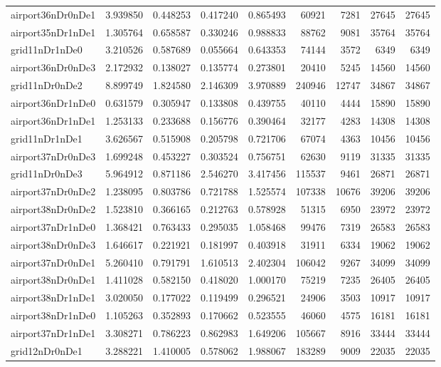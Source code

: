 \documentclass[../../../thesis.tex]{subfiles}
\begin{document}
\begin{longtable}{|l|r|r|r|r|r|r|r|r|}
airport36nDr0nDe1 & 3.939850 & 0.448253 & 0.417240 & 0.865493 & 60921 & 7281 & 27645 & 27645 \\
airport35nDr1nDe1 & 1.305764 & 0.658587 & 0.330246 & 0.988833 & 88762 & 9081 & 35764 & 35764 \\
grid11nDr1nDe0 & 3.210526 & 0.587689 & 0.055664 & 0.643353 & 74144 & 3572 & 6349 & 6349 \\
airport36nDr0nDe3 & 2.172932 & 0.138027 & 0.135774 & 0.273801 & 20410 & 5245 & 14560 & 14560 \\
grid11nDr0nDe2 & 8.899749 & 1.824580 & 2.146309 & 3.970889 & 240946 & 12747 & 34867 & 34867 \\
airport36nDr1nDe0 & 0.631579 & 0.305947 & 0.133808 & 0.439755 & 40110 & 4444 & 15890 & 15890 \\
airport36nDr1nDe1 & 1.253133 & 0.233688 & 0.156776 & 0.390464 & 32177 & 4283 & 14308 & 14308 \\
grid11nDr1nDe1 & 3.626567 & 0.515908 & 0.205798 & 0.721706 & 67074 & 4363 & 10456 & 10456 \\
airport37nDr0nDe3 & 1.699248 & 0.453227 & 0.303524 & 0.756751 & 62630 & 9119 & 31335 & 31335 \\
grid11nDr0nDe3 & 5.964912 & 0.871186 & 2.546270 & 3.417456 & 115537 & 9461 & 26871 & 26871 \\
airport37nDr0nDe2 & 1.238095 & 0.803786 & 0.721788 & 1.525574 & 107338 & 10676 & 39206 & 39206 \\
airport38nDr0nDe2 & 1.523810 & 0.366165 & 0.212763 & 0.578928 & 51315 & 6950 & 23972 & 23972 \\
airport37nDr1nDe0 & 1.368421 & 0.763433 & 0.295035 & 1.058468 & 99476 & 7319 & 26583 & 26583 \\
airport38nDr0nDe3 & 1.646617 & 0.221921 & 0.181997 & 0.403918 & 31911 & 6334 & 19062 & 19062 \\
airport37nDr0nDe1 & 5.260410 & 0.791791 & 1.610513 & 2.402304 & 106042 & 9267 & 34099 & 34099 \\
airport38nDr0nDe1 & 1.411028 & 0.582150 & 0.418020 & 1.000170 & 75219 & 7235 & 26405 & 26405 \\
airport38nDr1nDe1 & 3.020050 & 0.177022 & 0.119499 & 0.296521 & 24906 & 3503 & 10917 & 10917 \\
airport38nDr1nDe0 & 1.105263 & 0.352893 & 0.170662 & 0.523555 & 46060 & 4575 & 16181 & 16181 \\
airport37nDr1nDe1 & 3.308271 & 0.786223 & 0.862983 & 1.649206 & 105667 & 8916 & 33444 & 33444 \\
grid12nDr0nDe1 & 3.288221 & 1.410005 & 0.578062 & 1.988067 & 183289 & 9009 & 22035 & 22035 \\

\end{longtable}
\end{document}

